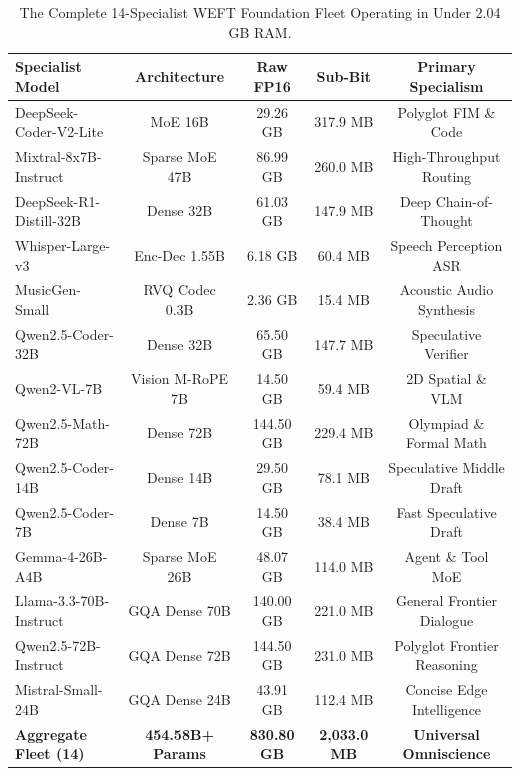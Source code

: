 \documentclass[11pt,a4paper]{article}
\begin{document}
\begin{table}[h]
\centering
\small
\begin{tabular}{lcccc}
\toprule
\textbf{Specialist Model} & \textbf{Architecture} & \textbf{Raw FP16} & \textbf{Sub-Bit} & \textbf{Primary Specialism} \\
\midrule
DeepSeek-Coder-V2-Lite & MoE 16B & 29.26 GB & 317.9 MB & Polyglot FIM \& Code \\
Mixtral-8x7B-Instruct & Sparse MoE 47B & 86.99 GB & 260.0 MB & High-Throughput Routing \\
DeepSeek-R1-Distill-32B & Dense 32B & 61.03 GB & 147.9 MB & Deep Chain-of-Thought \\
Whisper-Large-v3 & Enc-Dec 1.55B & 6.18 GB & 60.4 MB & Speech Perception ASR \\
MusicGen-Small & RVQ Codec 0.3B & 2.36 GB & 15.4 MB & Acoustic Audio Synthesis \\
Qwen2.5-Coder-32B & Dense 32B & 65.50 GB & 147.7 MB & Speculative Verifier \\
Qwen2-VL-7B & Vision M-RoPE 7B & 14.50 GB & 59.4 MB & 2D Spatial \& VLM \\
Qwen2.5-Math-72B & Dense 72B & 144.50 GB & 229.4 MB & Olympiad \& Formal Math \\
Qwen2.5-Coder-14B & Dense 14B & 29.50 GB & 78.1 MB & Speculative Middle Draft \\
Qwen2.5-Coder-7B & Dense 7B & 14.50 GB & 38.4 MB & Fast Speculative Draft \\
Gemma-4-26B-A4B & Sparse MoE 26B & 48.07 GB & 114.0 MB & Agent \& Tool MoE \\
Llama-3.3-70B-Instruct & GQA Dense 70B & 140.00 GB & 221.0 MB & General Frontier Dialogue \\
Qwen2.5-72B-Instruct & GQA Dense 72B & 144.50 GB & 231.0 MB & Polyglot Frontier Reasoning \\
Mistral-Small-24B & GQA Dense 24B & 43.91 GB & 112.4 MB & Concise Edge Intelligence \\
\midrule
\textbf{Aggregate Fleet (14)} & \textbf{454.58B+ Params} & \textbf{830.80 GB} & \textbf{2,033.0 MB} & \textbf{Universal Omniscience} \\
\bottomrule
\end{tabular}
\caption{The Complete 14-Specialist WEFT Foundation Fleet Operating in Under 2.04 GB RAM.}
\end{table}
\end{document}
